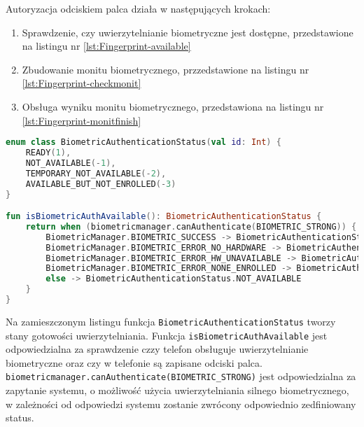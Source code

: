 Autoryzacja odciskiem palca działa w następujących krokach:
\begin{enumerate}
	\item Sprawdzenie, czy uwierzytelnianie biometryczne jest dostępne, przedstawione na listingu nr \ref{lst:Fingerprint-available}
	\item Zbudowanie monitu biometrycznego, przzedstawione na listingu nr \ref{lst:Fingerprint-checkmonit}
	\item Obsługa wyniku monitu biometrycznego, przedstawiona na listingu nr \ref{lst:Fingerprint-monitfinish}
\end{enumerate}

\begin{lstlisting}[caption=Sprawdzenie dostępności uwierzytelnienia biometrycznego, label={lst:Fingerprint-available}, language=kotlin]
enum class BiometricAuthenticationStatus(val id: Int) {
	READY(1),
	NOT_AVAILABLE(-1),
	TEMPORARY_NOT_AVAILABLE(-2),
	AVAILABLE_BUT_NOT_ENROLLED(-3)
}

fun isBiometricAuthAvailable(): BiometricAuthenticationStatus {
	return when (biometricmanager.canAuthenticate(BIOMETRIC_STRONG)) {
		BiometricManager.BIOMETRIC_SUCCESS -> BiometricAuthenticationStatus.READY
		BiometricManager.BIOMETRIC_ERROR_NO_HARDWARE -> BiometricAuthenticationStatus.NOT_AVAILABLE
		BiometricManager.BIOMETRIC_ERROR_HW_UNAVAILABLE -> BiometricAuthenticationStatus.TEMPORARY_NOT_AVAILABLE
		BiometricManager.BIOMETRIC_ERROR_NONE_ENROLLED -> BiometricAuthenticationStatus.AVAILABLE_BUT_NOT_ENROLLED
		else -> BiometricAuthenticationStatus.NOT_AVAILABLE
	}
}
\end{lstlisting}
Na zamieszczonym listingu funkcja \texttt{BiometricAuthenticationStatus} tworzy stany gotowości uwierzytelniania.
Funkcja \texttt{isBiometricAuthAvailable} jest odpowiedzialna za sprawdzenie czzy telefon obsługuje uwierzytelnianie biometryczne oraz czy w telefonie są zapisane odciski palca. \texttt{biometricmanager.canAuthenticate(BIOMETRIC\_STRONG)} jest odpowiedzialna za zapytanie systemu, o możliwość użycia uwierzytelniania silnego biometrycznego, w zależności od odpowiedzi systemu zostanie zwrócony odpowiednio zedfiniowany status.

